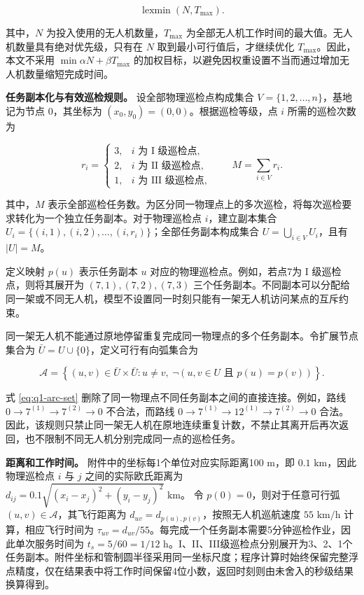 \documentclass[UTF8,a4paper,12pt]{ctexart}
\numberwithin{equation}{section}
\numberwithin{equation}{section}
\begin{document}
\begin{equation}
  \operatorname{lexmin}\left(N,T_{\max}\right).
  \label{eq:q1-lex-objective}
\end{equation}

其中，\(N\) 为投入使用的无人机数量，\(T_{\max}\) 为全部无人机工作时间的最大值。无人机数量具有绝对优先级，只有在 \(N\) 取到最小可行值后，才继续优化 \(T_{\max}\)。因此，本文不采用
\(\min \alpha N+\beta T_{\max}\) 的加权目标，以避免因权重设置不当而通过增加无人机数量缩短完成时间。

\noindent\textbf{任务副本化与有效巡检规则。}
设全部物理巡检点构成集合 \(V=\{1,2,\ldots,n\}\)，基地记为节点 \(0\)，其坐标为
\((x_0,y_0)=(0,0)\)。根据巡检等级，点 \(i\) 所需的巡检次数为

\[
r_i=
\begin{cases}
  3, & i\text{ 为 I 级巡检点},\\
  2, & i\text{ 为 II 级巡检点},\\
  1, & i\text{ 为 III 级巡检点},
\end{cases}
\qquad
M=\sum_{i\in V}r_i.
\]

其中，\(M\) 表示全部巡检任务数。为区分同一物理点上的多次巡检，将每次巡检要求转化为一个独立任务副本。对于物理巡检点 \(i\)，建立副本集合
\(U_i=\{(i,1),(i,2),\ldots,(i,r_i)\}\)；全部任务副本构成集合
\(U=\bigcup_{i\in V}U_i\)，且有 \(|U|=M\)。

定义映射 \(p(u)\) 表示任务副本 \(u\) 对应的物理巡检点。例如，若点7为 I 级巡检点，则将其展开为
\((7,1),(7,2),(7,3)\) 三个任务副本。不同副本可以分配给同一架或不同无人机，模型不设置同一时刻只能有一架无人机访问某点的互斥约束。

同一架无人机不能通过原地停留重复完成同一物理点的多个任务副本。令扩展节点集合为
\(\bar U=U\cup\{0\}\)，定义可行有向弧集合为

\begin{equation}
  \mathcal A=
  \left\{
  (u,v)\in\bar U\times\bar U:
  u\neq v,\
  \neg\left(u,v\in U\text{ 且 }p(u)=p(v)\right)
  \right\}.
  \label{eq:q1-arc-set}
\end{equation}

式 \eqref{eq:q1-arc-set} 删除了同一物理点不同任务副本之间的直接连接。例如，路线
\(0\rightarrow7^{(1)}\rightarrow7^{(2)}\rightarrow0\)
不合法，而路线
\(0\rightarrow7^{(1)}\rightarrow12^{(1)}
\rightarrow7^{(2)}\rightarrow0\)
合法。因此，该规则只禁止同一架无人机在原地连续重复计数，不禁止其离开后再次返回，也不限制不同无人机分别完成同一点的巡检任务。

\noindent\textbf{距离和工作时间。}
附件中的坐标每1个单位对应实际距离100 m，即 \(0.1\text{ km}\)，因此物理巡检点
\(i\) 与 \(j\) 之间的实际欧氏距离为
\(d_{ij}=0.1\sqrt{(x_i-x_j)^2+(y_i-y_j)^2}\text{ km}\)。
令 \(p(0)=0\)，则对于任意可行弧 \((u,v)\in\mathcal A\)，其飞行距离为
\(d_{uv}=d_{p(u),p(v)}\)，按照无人机巡航速度 \(55\text{ km/h}\) 计算，相应飞行时间为
\(\tau_{uv}=d_{uv}/55\)。每完成一个任务副本需要5分钟巡检作业，因此单次服务时间为
\(t_s=5/60=1/12\text{ h}\)。I、II、III级巡检点分别展开为3、2、1个任务副本。附件坐标和管制圆半径采用同一坐标尺度；程序计算时始终保留完整浮点精度，仅在结果表中将工作时间保留4位小数，返回时刻则由未舍入的秒级结果换算得到。
\end{document}
